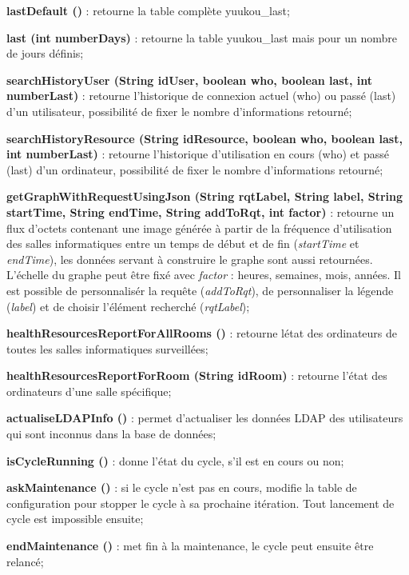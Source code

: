 \noindent\textbf{lastDefault ()} : retourne la table compl\`ete \textsf{yuukou\_last};

\noindent\textbf{last (int numberDays)} : retourne la table \textsf{yuukou\_last} mais pour un nombre de jours d\'efinis;

\noindent\textbf{searchHistoryUser (String idUser, boolean who, boolean last, int numberLast)} : retourne l'historique de connexion actuel (who) ou pass\'e (last) d'un utilisateur, possibilit\'e de fixer le nombre d'informations retourn\'e;

\noindent\textbf{searchHistoryResource (String idResource, boolean who, boolean last, int numberLast)} : retourne l'historique d'utilisation en cours (who) et pass\'e (last) d'un ordinateur, possibilit\'e de fixer le nombre d'informations retourn\'e;

\noindent\textbf{getGraphWithRequestUsingJson (String rqtLabel, String label, String startTime, String endTime, String addToRqt, int factor)} : retourne un flux d'octets contenant une image g\'en\'er\'ee \`a partir de la fr\'equence d'utilisation des salles informatiques entre un temps de d\'ebut et de fin (\textit{startTime} et \textit{endTime}), les donn\'ees servant \`a construire le graphe sont aussi retourn\'ees. L'\'echelle du graphe peut \^etre fix\'e avec \textit{factor} : heures, semaines, mois, ann\'ees.
Il est possible de personnalis\'er la requ\^ete (\textit{addToRqt}), de personnaliser la l\'egende (\textit{label}) et de choisir l'\'el\'ement recherch\'e (\textit{rqtLabel});

\noindent\textbf{healthResourcesReportForAllRooms ()} : retourne l\'etat des ordinateurs de toutes les salles informatiques surveill\'ees;

\noindent\textbf{healthResourcesReportForRoom (String idRoom)} : retourne l'\'etat des ordinateurs d'une salle sp\'ecifique;

\noindent\textbf{actualiseLDAPInfo ()} : permet d'actualiser les donn\'ees LDAP des utilisateurs qui sont inconnus dans la base de donn\'ees;

\noindent\textbf{isCycleRunning ()} : donne l'\'etat du cycle, s'il est en cours ou non;

\noindent\textbf{askMaintenance ()} : si le cycle n'est pas en cours, modifie la table de configuration pour stopper le cycle \`a sa prochaine it\'eration.
Tout lancement de cycle est impossible ensuite;

\noindent\textbf{endMaintenance ()} : met fin \`a la maintenance, le cycle peut ensuite \^etre relanc\'e;

